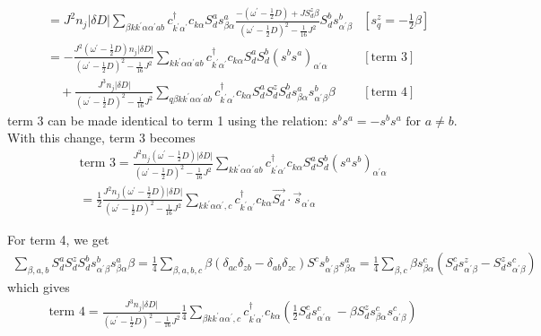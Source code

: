 \documentclass{revtex4-2}
\begin{document}
\begin{align}
							   &= J^2 n_j |\delta D|\sum_{\beta k k^\prime \alpha \alpha^\prime a b} c^\dagger_{k^\prime\alpha^\prime}c_{k\alpha} S_d^a s^a_{\beta \alpha} \frac{-\left(\omega^\prime - \frac{1}{2}D\right) + J S_d^z \beta}{\left(\omega^\prime - \frac{1}{2}D\right)^2 - \frac{1}{16}J^2} S_d^b s^b_{\alpha^\prime \beta} & \left[s_q^z = -\frac{1}{2}\beta\right] \\
							   &= -\frac{J^2\left(\omega^\prime - \frac{1}{2}D\right) n_j |\delta D|}{\left(\omega^\prime - \frac{1}{2}D\right)^2 - \frac{1}{16}J^2}\sum_{k k^\prime \alpha \alpha^\prime a b} c^\dagger_{k^\prime\alpha^\prime}c_{k\alpha} S_d^a  S_d^b \left(s^b s^a\right)_{\alpha^\prime \alpha} & \left[\text{term 3}\right] \\
							   &\quad+ \frac{J^3 n_j |\delta D|}{\left(\omega^\prime - \frac{1}{2}D\right)^2 - \frac{1}{16}J^2} \sum_{q\beta k k^\prime \alpha \alpha^\prime a b} c^\dagger_{k^\prime\alpha^\prime}c_{k\alpha} S_d^a S_d^z S_d^b s^a_{\beta \alpha} s^b_{\alpha^\prime \beta} \beta & \left[\text{term 4}\right]
\end{align}
term 3 can be made identical to term 1 using the relation: \(s^b s^a = -s^b s^a \text{ for } a \neq b\). With this change, term 3 becomes
\begin{equation}\begin{aligned}
	\text{term 3} = \frac{J^2 n_j \left(\omega^\prime - \frac{1}{2}D\right)|\delta D|}{\left(\omega^\prime - \frac{1}{2}D\right)^2 - \frac{1}{16}J^2}\sum_{k k^\prime \alpha \alpha^\prime a b} c^\dagger_{k^\prime\alpha^\prime}c_{k\alpha} S_d^a  S_d^b \left(s^a s^b\right)_{\alpha^\prime \alpha} \\
	= \frac{1}{2}\frac{J^2 n_j \left(\omega^\prime - \frac{1}{2}D\right)|\delta D|}{\left(\omega^\prime - \frac{1}{2}D\right)^2 - \frac{1}{16}J^2} \sum_{k k^\prime \alpha \alpha^\prime,c} c^\dagger_{k^\prime\alpha^\prime} c_{k\alpha} \vec{S_d}\cdot\vec{s}_{\alpha^\prime \alpha}
\end{aligned}\end{equation}

For term 4, we get
\begin{equation}\begin{aligned}
	\sum_{\beta,a,b} S_d^a S_d^z S_d^b s^b_{\alpha^\prime \beta} s^a_{\beta \alpha} \beta = \frac{1}{4}\sum_{\beta,a,b,c}\beta\left(\delta_{ac}\delta_{zb} - \delta_{ab}\delta_{zc}\right) S^cs^b_{\alpha^\prime \beta} s^a_{\beta \alpha} = \frac{1}{4}\sum_{\beta,c}\beta s^c_{\beta\alpha}\left(S^c_d s^z_{\alpha^\prime\beta} - S^z_d s^c_{\alpha^\prime\beta}\right)
\end{aligned}\end{equation}
which gives
\begin{equation}\begin{aligned}
	\text{term 4} = \frac{J^3 n_j |\delta D|}{\left(\omega^\prime - \frac{1}{2}D\right)^2 - \frac{1}{16}J^2} \frac{1}{4}\sum_{\beta k k^\prime \alpha \alpha^\prime,c} c^\dagger_{k^\prime\alpha^\prime} c_{k\alpha} \left(\frac{1}{2}S_d^c s^c_{\alpha^\prime\alpha}\ - \beta S_d^z s^c_{\beta\alpha}s^c_{\alpha^\prime\beta}\right)
\end{aligned}\end{equation}
\end{document}
